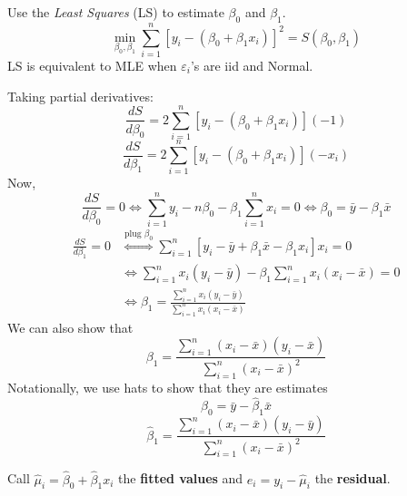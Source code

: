 Use the \emph{Least Squares} (LS) to estimate $ \beta_0 $ and $ \beta_1 $.
\[ \min_{\beta_0,\beta_1}\sum\limits_{i=1}^{n} 
\left[ y_i-(\beta_0+\beta_1 x_i) \right]^2=S(\beta_0,\beta_1) \]
LS is equivalent to MLE when $ \varepsilon_i $'s are iid and Normal.

Taking partial derivatives:
\[ \frac{dS}{d\beta_0}=2
\sum\limits_{i=1}^{n} \left[ y_i-(\beta_0+\beta_1x_i) \right](-1)  \]
\[ \frac{dS}{d\beta_1}=2
\sum\limits_{i=1}^{n} \left[ y_i-(\beta_0+\beta_1x_i) \right](-x_i)  \]
Now,
\[ \frac{dS}{d\beta_0}=0
\iff \sum\limits_{i=1}^{n}y_i-n\beta_0-
\beta_1 \sum\limits_{i=1}^{n} x_i=0
\iff \beta_0=\bar{y}-\beta_1\bar{x}  \]
\begin{align*}
\frac{dS}{d\beta_1}=0
&\stackrel{\text{plug }\beta_0}{\iff}
\sum\limits_{i=1}^{n} \left[ y_i-\bar{y}+\beta_1\bar{x}-\beta_1 x_i \right]x_i=0\\
&\iff \sum\limits_{i=1}^{n} x_i(y_i-\bar{y})-\beta_1
\sum\limits_{i=1}^{n} x_i(x_i-\bar{x})=0\\
&\iff \beta_1=\frac{\sum\limits_{i=1}^{n} x_i(y_i-\bar{y})}{\sum\limits_{i=1}^{n}
x_i 
(x_i-\bar{x})} 
\end{align*}
We can also show that
\[ \beta_1=\frac{\sum\limits_{i=1}^{n} (x_i-\bar{x})(y_i-\bar{x})}{
    \sum\limits_{i=1}^{n} (x_i-\bar{x})^2
}  \]
Notationally, we use hats to show that they are estimates
\[ \hat{\beta}_0=\bar{y}-\hat{\beta}_1\bar{x} \]
\[ \hat{\beta}_1=
\frac{\sum\limits_{i=1}^{n} (x_i-\bar{x})(y_i-\bar{y})}{
    \sum\limits_{i=1}^{n} (x_i-\bar{x})^2
}  \]

Call $ \hat{\mu}_i=\hat{\beta}_0+\hat{\beta}_1x_i $ the \textbf{fitted values}
and $ e_i=y_i-\hat{\mu}_i $ the \textbf{residual}.
